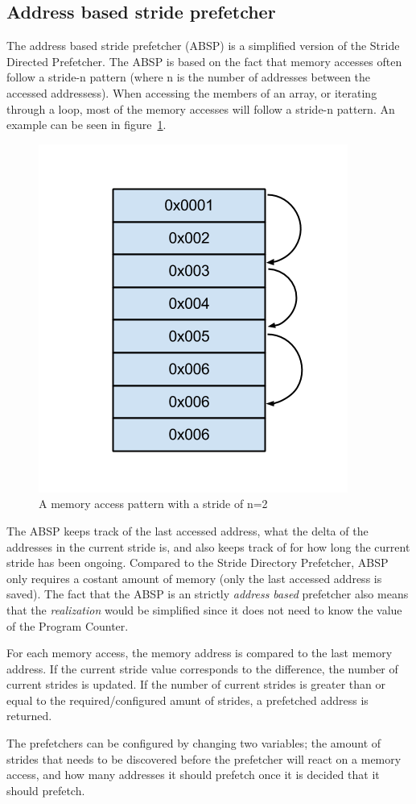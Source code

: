 \subsection{Address based stride prefetcher}
\label{sec:stridePrefetcher}
The address based stride prefetcher (ABSP) is a simplified version of
the Stride Directed Prefetcher. The ABSP is based on the fact that
memory accesses often follow a stride-n pattern (where n is the number
of addresses between the accessed addressess). When accessing the
members of an array, or iterating through a loop, most of the memory
accesses will follow a stride-n pattern. An example can be seen in
figure~\ref{fig:stride}.

\begin{figure}[H]
\centerline{\includegraphics[scale=0.5]{./figures/stride}}
\caption{A memory access pattern with a stride of n=2}
\label{fig:stride}
\end{figure}

The ABSP keeps track of the last accessed address, what the delta of the addresses in the current stride is, and
also keeps track of for how long the current stride has been
ongoing. Compared to the Stride Directory Prefetcher, ABSP only requires a costant amount of memory (only the last accessed address is saved). The fact that the ABSP is an strictly \emph{address based} prefetcher also means that the \emph{realization} would be simplified since it does not need to know the value of the Program Counter.

For each memory access, the memory address is compared to the last
memory address. If the current stride value corresponds to the
difference, the number of current strides is updated. If the number of
current strides is greater than or equal to the required/configured
amunt of strides, a prefetched address is returned.  

The prefetchers can be configured by changing two variables;
the amount of strides that needs to be discovered before
the prefetcher will react on a memory access, and how many addresses it should prefetch once it is decided that it should prefetch.

